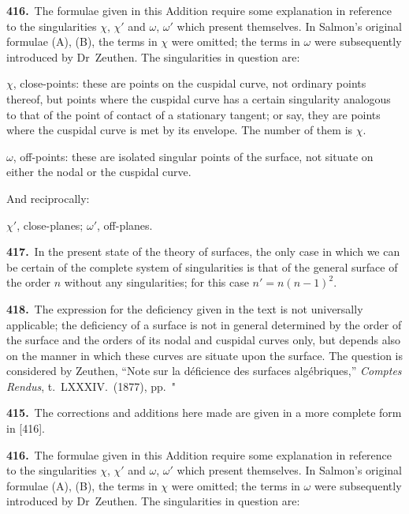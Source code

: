 \documentclass[11pt,a4paper]{article}
\theoremstyle{plain}
\theoremstyle{definition}
\theoremstyle{remark}
\begin{document}
\noindent\textbf{416.}\ The formulae given in this Addition require some explanation in reference to the singularities $\chi$, $\chi'$ and $\omega$, $\omega'$ which present themselves. In Salmon's original formulae (A), (B), the terms in $\chi$ were omitted; the terms in $\omega$ were subsequently introduced by Dr~Zeuthen. The singularities in question are:

$\chi$, close-points: these are points on the cuspidal curve, not ordinary points thereof, but points where the cuspidal curve has a certain singularity analogous to that of the point of contact of a stationary tangent; or say, they are points where the cuspidal curve is met by its envelope. The number of them is $\chi$.

$\omega$, off-points: these are isolated singular points of the surface, not situate on either the nodal or the cuspidal curve.

And reciprocally:

$\chi'$, close-planes; $\omega'$, off-planes.

\smallskip

\noindent\textbf{417.}\ In the present state of the theory of surfaces, the only case in which we can be certain of the complete system of singularities is that of the general surface of the order $n$ without any singularities; for this case $n'=n(n-1)^2$.

\smallskip

\noindent\textbf{418.}\ The expression for the deficiency given in the text is not universally applicable; the deficiency of a surface is not in general determined by the order of the surface and the orders of its nodal and cuspidal curves only, but depends also on the manner in which these curves are situate upon the surface. The question is considered by Zeuthen, ``Note sur la d\'{e}ficience des surfaces alg\'{e}briques,'' \textit{Comptes Rendus}, t.~LXXXIV.\ (1877), pp.~"

\newpage
\setcounter{page}{624}

\smallskip

\noindent\textbf{415.}\ The corrections and additions here made are given in a more complete form in [416].

\smallskip

\noindent\textbf{416.}\ The formulae given in this Addition require some explanation in reference to the singularities $\chi$, $\chi'$ and $\omega$, $\omega'$ which present themselves. In Salmon's original formulae (A), (B), the terms in $\chi$ were omitted; the terms in $\omega$ were subsequently introduced by Dr~Zeuthen. The singularities in question are:
\end{document}
